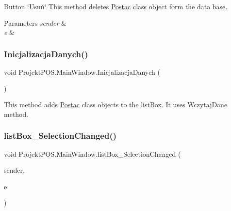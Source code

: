 Button \char`\"{}\+Usuń\char`\"{} This method deletes \hyperlink{class_projekt_p_o_s_1_1_postac}{Postac} class object form the data base. 


\begin{DoxyParams}{Parameters}
{\em sender} & \\
\hline
{\em e} & \\
\hline
\end{DoxyParams}
\mbox{\label{class_projekt_p_o_s_1_1_main_window_a1c820b42a3dc4d0baa35192573a3248d}} 
\subsubsection{\texorpdfstring{Inicjalizacja\+Danych()}{InicjalizacjaDanych()}}
{\footnotesize\ttfamily void Projekt\+P\+O\+S.\+Main\+Window.\+Inicjalizacja\+Danych (\begin{DoxyParamCaption}{ }\end{DoxyParamCaption})\hspace{0.3cm}{\ttfamily [private]}}



This method adds \hyperlink{class_projekt_p_o_s_1_1_postac}{Postac} class objects to the list\+Box. It uses Wczytaj\+Dane method. 

\mbox{\label{class_projekt_p_o_s_1_1_main_window_a5b2c07df737c6583f39ba146500523eb}} 
\subsubsection{\texorpdfstring{list\+Box\+\_\+\+Selection\+Changed()}{listBox\_SelectionChanged()}}
{\footnotesize\ttfamily void Projekt\+P\+O\+S.\+Main\+Window.\+list\+Box\+\_\+\+Selection\+Changed (\begin{DoxyParamCaption}\item[{object}]{sender,  }\item[{Selection\+Changed\+Event\+Args}]{e }\end{DoxyParamCaption})\hspace{0.3cm}{\ttfamily [private]}}




